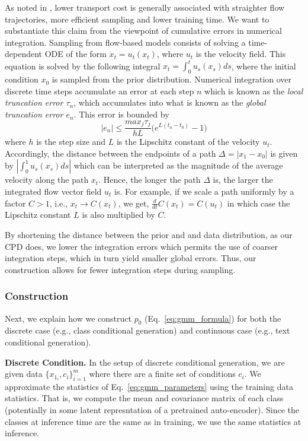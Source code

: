 As noted in \cite{pooladian2023multisample}, lower transport cost is generally associated with straighter flow trajectories, more efficient sampling and lower training time. We want to substantiate this claim from the viewpoint of cumulative errors in numerical integration.
Sampling from flow-based models consists of solving a time-dependent ODE of the form $\dot{x}_t =u_t(x_t)$, where $u_t$ is the velocity field. This equation is solved by the following integral $x_t = \int_{0}^t u_s(x_s)ds$, where the initial condition $x_0 $ is sampled from the prior distribution. Numerical integration over discrete time steps accumulate an error at each step $n$ which is known as the \emph{local truncation error $\tau_n$}, which accumulates into what is known as the \emph{global truncation error $e_n$}.  This error is bounded by ~\cite{suli2003introduction}
\begin{equation}
    |e_n| \leq \frac{max_j\tau_j}{hL}\big(e^{L(t_n-t_0)} - 1\big)
\end{equation}\label{eq:truncation_error_bound} 
where $h$ is the step size and $L$ is the Lipschitz constant of the velocity $u_t$. 
Accordingly, the distance between the endpoints of a path $\Delta = |x_1  - x_0|$  is given by $|\int_0^1 u_s(x_s)ds|$ which can be interpreted as the magnitude of the average velocity along the path $x_t$. Hence, the longer the path $\Delta$ is, the larger the integrated flow vector field $u_t$ is.
For example, if we scale a path uniformly by a factor $C>1$, i.e., $x_t \rightarrow C(x_t)$, we get,  $\frac{d}{dt}C(x_t) = C(u_t)$ in which case the Lipschitz constant $L$ is also multiplied by $C$.

By shortening the distance between the prior and and data distribution, as our CPD does, we lower the integration errors which permits the use of coarser integration steps, which in turn yield smaller global errors. Thus, our construction allows for fewer integration steps during sampling.

\subsubsection{Construction}


Next, we explain how we construct $p_0$ (Eq.~\ref{eq:gmm_formula}) for both the discrete case (e.g., class conditional generation) and continuous case (e.g., text conditional generation). 

\noindent \textbf{Discrete Condition.} \quad
In the setup of discrete conditional generation, we are given data $\{x_{1_i}, c_i\}_{i=1}^m$ where there are a finite set of conditions $c_i$.
We approximate the statistics of Eq.~\ref{eq:gmm_parameters} using the training data statistics. That is, we compute the mean and covariance matrix of each class (potentially in some latent represntation of a pretrained auto-encoder).  Since the classes at inference time are the same as in training, we use the same statistics at inference. 

